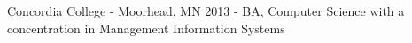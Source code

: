 Concordia College - Moorhead, MN
2013 - BA, Computer Science with a concentration in Management Information Systems